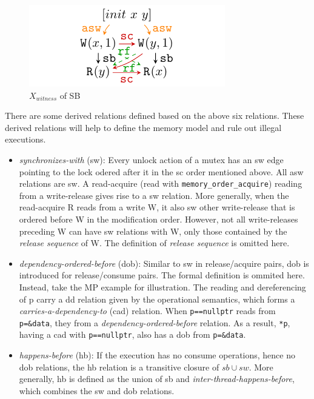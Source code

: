 \begin{figure}[htbp] %
	\centering
	\includegraphics[scale=1]{figure/exec-graph/SB2.pdf} %
	\caption{$X_{witness}$ of SB} %
	\label{XwitnessSB} %
\end{figure}

There are some derived relations defined based on the above six relations. These derived relations will help to define the memory model and rule out illegal executions.

\begin{itemize}
	\item \textit{synchronizes-with} (sw): Every unlock action of a mutex has an sw edge pointing to the lock odered after it in the sc order mentioned above. All asw relations are sw. A read-acquire (read with \texttt{memory\_order\_acquire}) reading from a write-release gives rise to a sw relation. More generally, when the read-acquire R reads from a write W, it also sw other write-release that is ordered before W in the modification order. However, not all write-releases preceding W can have sw relations with W, only those contained by the \textit{release sequence} of W. The definition of \textit{release sequence} is omitted here.
	\item \textit{dependency-ordered-before} (dob): Similar to sw in release/acquire pairs, dob is introduced for release/consume pairs. The formal definition is ommited here. Instead, take the MP example for illustration. The reading and dereferencing of p carry a dd relation given by the operational semantics, which forms a \textit{carries-a-dependency-to} (cad) relation. When \texttt{p==nullptr} reads from \texttt{p=\&data}, they from a \textit{dependency-ordered-before} relation. As a result, \texttt{*p}, having a cad with \texttt{p==nullptr}, also has a dob from \texttt{p=\&data}.
	\item \textit{happens-before} (hb): If the execution has no consume operations, hence no dob relations, the hb relation is a transitive closure of $sb \cup sw$. More generally, hb is defined as the union of sb and \textit{inter-thread-happens-before}, which combines the sw and dob relations.
\end{itemize}


